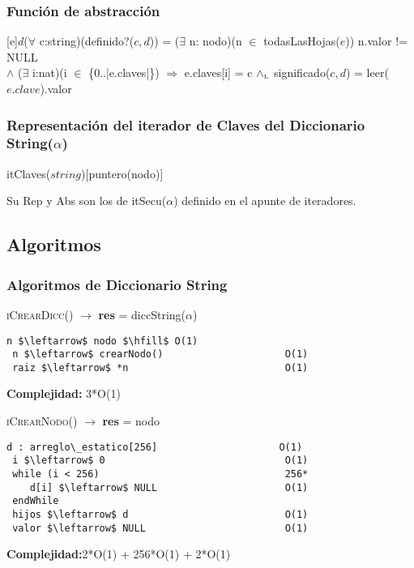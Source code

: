 
\subsubsection{Funci\'on de abstracci\'on}
 [e]{$d$}{($\forall$ c:string)(definido?($c,d$)) = ($\exists$ n: nodo)(n $\in$ todasLasHojas($e$)) n.valor != NULL \\ $\land$ ($\exists$ i:nat)(i $\in$ \{0..|e.claves|\}) $\Rightarrow$ e.claves[i] = c $\land_{\mathrm{\scriptscriptstyle{L}}}$ significado($c,d$) = leer($e.clave$).valor}

  \subsubsection{Representaci\'on del iterador de Claves del Diccionario String($\alpha$)}



    \begin{Estructura}{itClaves($string$)}[puntero(nodo)]
    \end{Estructura}

    Su Rep y Abs son los de itSecu($\alpha$) definido en el apunte de iteradores.

  \subsection{Algoritmos}
\subsubsection{Algoritmos de Diccionario String}

\textsc{iCrearDicc}() $\rightarrow$ \textbf{res} = diccString($\alpha$)
\begin{lstlisting}[mathescape]
 n $\leftarrow$ nodo $\hfill$ O(1)
 n $\leftarrow$ crearNodo() 					O(1)
 raiz $\leftarrow$ *n 							O(1)
\end{lstlisting}
\textbf{Complejidad:} 3*O(1)

\textsc{iCrearNodo}() $\rightarrow$ \textbf{res} = nodo
\begin{lstlisting}[mathescape]
 d : arreglo\_estatico[256] 					O(1)
 i $\leftarrow$ 0 								O(1)
 while (i < 256) 								256*
 	d[i] $\leftarrow$ NULL 						O(1)
 endWhile
 hijos $\leftarrow$ d 							O(1)
 valor $\leftarrow$ NULL 						O(1)
\end{lstlisting}
\textbf{Complejidad:}2*O(1) + 256*O(1) + 2*O(1)

